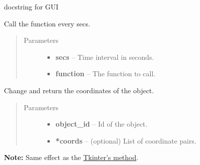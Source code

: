 \documentclass[letterpaper,10pt,english]{sphinxmanual}
\begin{document}
\begin{fulllineitems}
\label{api:graphic.GUI}
docstring for GUI

\begin{fulllineitems}
\label{api:graphic.GUI.after}
Call the function every secs.
\begin{quote}\begin{description}
\item[{Parameters}] \leavevmode\begin{itemize}
\item {} 
\textbf{secs} -- Time interval in seconds.

\item {} 
\textbf{function} -- The function to call.

\end{itemize}

\end{description}\end{quote}

\end{fulllineitems}


\begin{fulllineitems}
\label{api:graphic.GUI.coords}
Change and return the coordinates of the object.
\begin{quote}\begin{description}
\item[{Parameters}] \leavevmode\begin{itemize}
\item {} 
\textbf{object\_id} -- Id of the object.

\item {} 
\textbf{*coords} -- (optional) List of coordinate pairs.

\end{itemize}

\end{description}\end{quote}

\textbf{Note:} Same effect as the \href{http://goo.gl/1PMqtC}{Tkinter's method}.

\end{fulllineitems}


\end{fulllineitems}
\end{document}
